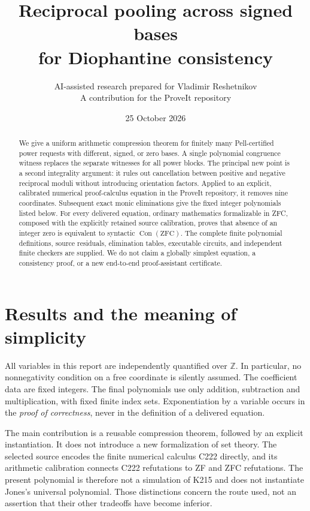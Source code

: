 \documentclass[10pt,letterpaper]{article}
\title{Reciprocal pooling across signed bases\\for Diophantine consistency}
\author{AI-assisted research prepared for Vladimir Reshetnikov\\\small A contribution for the ProveIt repository}
\date{25 October 2026}
\theoremstyle{remark}\newtheorem{remark}[theorem]{Remark}
\newcommand{\Z}{\mathbb Z}\newcommand{\Q}{\mathbb Q}\newcommand{\N}{\mathbb N}
\newcommand{\Con}{\operatorname{Con}}
\begin{document}
\maketitle
\begin{abstract}
We give a uniform arithmetic compression theorem for finitely many
Pell-certified power requests with different, signed, or zero bases.
A single polynomial congruence witness replaces the separate witnesses
for all power blocks. The principal new point is a second integrality
argument: it rules out cancellation between positive and negative
reciprocal moduli without introducing orientation factors. Applied to an
explicit, calibrated numerical proof-calculus equation in the ProveIt
repository, it removes nine coordinates. Subsequent exact monic
eliminations give the fixed integer polynomials listed below.
For every delivered equation, ordinary mathematics formalizable in ZFC,
composed with the explicitly retained source calibration, proves that
absence of an integer zero is equivalent to syntactic $\Con(\mathrm{ZFC})$.
The complete finite polynomial definitions, source residuals, elimination
tables, executable circuits, and independent finite checkers are supplied.
We do not claim a globally simplest equation, a consistency proof, or a
new end-to-end proof-assistant certificate.
\end{abstract}

\section{Results and the meaning of simplicity}



All variables in this report are independently quantified over $\Z$.
In particular, no nonnegativity condition on a free coordinate is silently
assumed. The coefficient data are fixed integers. The final polynomials
use only addition, subtraction and multiplication, with fixed finite
index sets. Exponentiation by a variable occurs in the \emph{proof of
correctness}, never in the definition of a delivered equation.

The main contribution is a reusable compression theorem, followed by an
explicit instantiation. It does not introduce a new formalization of set
theory. The selected source encodes the finite numerical calculus C222
directly, and its arithmetic calibration connects C222 refutations to
ZF and ZFC refutations. The present polynomial is therefore not a
simulation of K215 and does not instantiate Jones's universal polynomial.
Those distinctions concern the route used, not an assertion that their
other tradeoffs have become inferior.
\end{document}
